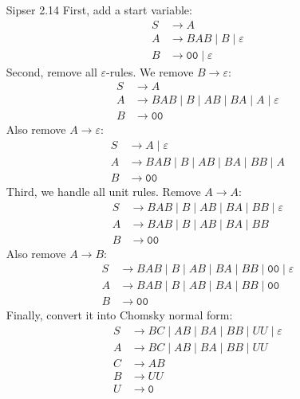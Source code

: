 \documentclass[12pt,a4paper]{ctexart}
\def\eps{\varepsilon}
\begin{document}
\begin{enumerate}
\item[Sipser 2.14]
First, add a start variable:
\begin{align*}
S & \to A\\
A & \to BAB\mid B\mid \eps\\
B & \to \mathtt{00}\mid\eps
\end{align*}
Second, remove all $\eps$-rules. We remove $B\to\eps$:
\begin{align*}
S & \to A\\
A & \to BAB\mid B\mid AB\mid BA\mid A\mid\eps\\
B & \to \mathtt{00}
\end{align*}
Also remove $A\to\eps$:
\begin{align*}
S & \to A\mid\eps\\
A & \to BAB\mid B\mid AB\mid BA\mid BB\mid A\\
B & \to \mathtt{00}
\end{align*}
Third, we handle all unit rules. Remove $A\to A$:
\begin{align*}
S & \to BAB\mid B\mid AB\mid BA\mid BB\mid \eps\\
A & \to BAB\mid B\mid AB\mid BA\mid BB\\
B & \to \mathtt{00}
\end{align*}
Also remove $A\to B$:
\begin{align*}
S & \to BAB\mid B\mid AB\mid BA\mid BB\mid \mathtt{00}\mid\eps\\
A & \to BAB\mid B\mid AB\mid BA\mid BB\mid \mathtt{00}\\
B & \to \mathtt{00}
\end{align*}
Finally, convert it into Chomsky normal form:
\begin{align*}
S & \to BC\mid AB\mid BA\mid BB\mid UU\mid \eps\\
A & \to BC\mid AB\mid BA\mid BB\mid UU\\
C & \to AB\\
B & \to UU\\
U & \to \mathtt{0}
\end{align*}
\end{enumerate}
\end{document}
